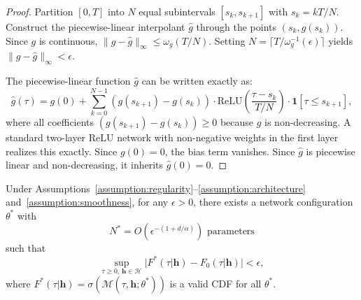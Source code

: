\begin{proof}
Partition $[0,T]$ into $N$ equal subintervals $[s_k, s_{k+1}]$ with $s_k = kT/N$.
Construct the piecewise-linear interpolant $\hat{g}$ through the points
$(s_k, g(s_k))$. Since $g$ is continuous, $\|g - \hat{g}\|_\infty \leq \omega_g(T/N)$.
Setting $N = \lceil T/\omega_g^{-1}(\epsilon) \rceil$ yields $\|g-\hat{g}\|_\infty < \epsilon$.

The piecewise-linear function $\hat{g}$ can be written exactly as:
\[
\hat{g}(\tau) = g(0) + \sum_{k=0}^{N-1} (g(s_{k+1})-g(s_k))
\cdot \text{ReLU}\!\left(\frac{\tau - s_k}{T/N}\right)
\cdot \mathbf{1}[\tau \leq s_{k+1}],
\]
where all coefficients $(g(s_{k+1})-g(s_k)) \geq 0$ because $g$ is non-decreasing.
A standard two-layer ReLU network with non-negative weights in the first layer
realizes this exactly. Since $g(0)=0$, the bias term vanishes.
Since $\hat{g}$ is piecewise linear and non-decreasing, it inherits $\hat{g}(0)=0$.
\end{proof}

\begin{theorem}
\label{thm:universal_approx}
Under Assumptions~\ref{assumption:regularity}--\ref{assumption:architecture}
and~\ref{assumption:smoothness}, for any $\epsilon > 0$, there exists a
network configuration $\theta^*$ with
\[
N^* = O\!\left(\epsilon^{-(1+d/\alpha)}\right) \text{ parameters}
\]
such that
\[
\sup_{\tau \geq 0,\, \boldsymbol{h} \in \mathcal{H}}
\bigl|F^*(\tau|\boldsymbol{h}) - F_0(\tau|\boldsymbol{h})\bigr| < \epsilon,
\]
where $F^*(\tau|\boldsymbol{h}) = \sigma(\mathcal{M}(\tau,\boldsymbol{h};\theta^*))$
is a valid CDF for all $\theta^*$.
\end{theorem}


